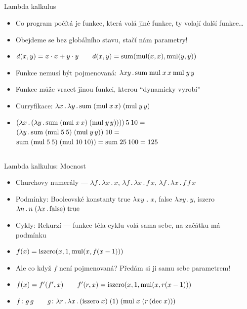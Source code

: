 \documentclass{beamer}
\begin{document}
\subsection{}
\begin{frame}{Lambda kalkulus}
\begin{itemize}
\item Co program počítá je funkce, která volá jiné funkce, ty volají další funkce\dots
\item Obejdeme se bez globálního stavu, stačí nám parametry!
\item $d(x, y) = x \cdot x + y \cdot y \qquad d(x, y) = {\rm sum}({\rm mul}(x, x), {\rm mul}(y, y))$
\pause
\item Funkce nemusí být pojmenovaná: $\lambda x y \,.\, {\rm sum} \; {\rm mul} \; x \, x \: {\rm mul} \; y \, y$
\pause
\item Funkce může vracet jinou funkci, kterou ``dynamicky vyrobí''
\item Curryfikace: $\lambda x \,.\, \lambda y \,.\, {\rm sum} \;({\rm mul} \;x \,x)\; ({\rm mul}\; y\, y)$
\item $(\lambda x \,.\, (\lambda y \,.\, {\rm sum}\; ({\rm mul}\; x\, x)\; ({\rm mul}\; y\, y))))\: 5\: 10 =$ \\
      $(\lambda y \,.\, {\rm sum}\; ({\rm mul}\; 5\: 5)\; ({\rm mul}\; y\, y))\; 10 =$ \\
      ${\rm sum}\; ({\rm mul}\; 5\: 5)\; ({\rm mul}\; 10\: 10)) = {\rm sum}\; 25\: 100 = 125$
\end{itemize}
\end{frame}

\subsection{}
\begin{frame}{Lambda kalkulus: Mocnost}
\begin{itemize}
\item Churchovy numerály --- $\lambda f \,.\, \lambda x \,.\, x$, $\lambda f \,.\, \lambda x \,.\, f\, x$, $\lambda f \,.\, \lambda x \,.\, f\, f\, x$
\item Podmínky: Booleovské konstanty true $\lambda xy \,\,.\,\, x$, false $\lambda xy \,.\, y$, iszero $\lambda n \,.\, n\; (\lambda x \,.\, {\rm false}) \; {\rm true}$
\item Cykly: Rekurzí --- funkce těla cyklu volá sama sebe, na začátku má podmínku
\pause
\item $f(x) = {\rm iszero}(x, 1, {\rm mul}(x, f(x - 1)))$
\item Ale co když $f$ není pojmenovaná? Předám si ji samu sebe parametrem!
\item $f(x) = f'(f', x) \qquad f'(r, x) = {\rm iszero}(x, 1, {\rm mul}(x, r(x - 1)))$
\item $f\colon g\, g \qquad g\colon \lambda r \,.\, \lambda x \,.\, ({\rm iszero}\; x)\; (1)\; ({\rm mul}\; x\; (r\, ({\rm dec}\; x)))$
\end{itemize}
\end{frame}
\end{document}
